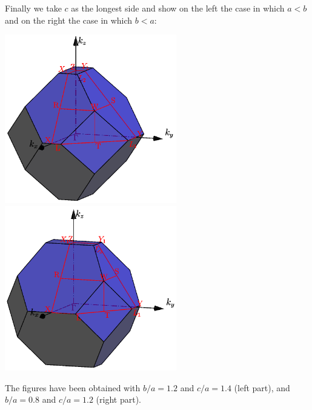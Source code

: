 \documentclass[12pt,a4paper]{article}
\begin{document}
Finally we take $c$ as the longest side and show on the left the case in 
which $a<b$ and on the right the case in which $b<a$:
\begin{center}
\includegraphics[width=7.5cm,angle=0]{images/bco_1.png} \hspace{1.0 cm}
\includegraphics[width=7.5cm,angle=0]{images/bco_6.png}
\end{center}
The figures have been obtained with $b/a=1.2$ and $c/a=1.4$ (left part), and
$b/a=0.8$ and $c/a=1.2$ (right part).
\end{document}
